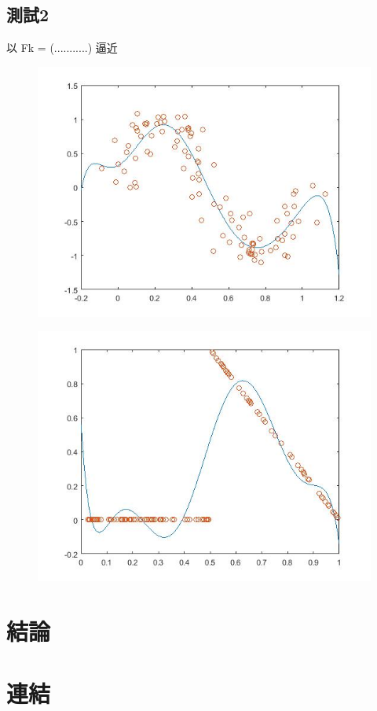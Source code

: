 \documentclass[a4paper]{article}
\begin{document}
\subsection{測試2}
以 Fk = (...........) 逼近
\begin{figure}[!htbp]
	\centering
	\includegraphics[width=.8\linewidth]{Figure21.jpg}
\end{figure}
\begin{figure}[!htbp]
	\centering
	\includegraphics[width=.8\linewidth]{Figure22.jpg}
\end{figure}
\section{結論}

\section{連結}
\end{document}
